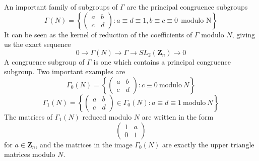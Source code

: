 An important family of subgroups of $\Gamma$ are the principal congruence subgroups
%
\[ \Gamma(N) = \left\{ \begin{pmatrix} a & b \\ c & d \end{pmatrix} : a \equiv d \equiv 1, b \equiv c \equiv 0\ \ \text{modulo N} \right\} \]
%
It can be seen as the kernel of reduction of the coefficients of $\Gamma$ modulo $N$, giving us the exact sequence
%
\[ 0 \to \Gamma(N) \to \Gamma \to SL_2(\mathbf{Z}_n) \to 0 \]
%
A congruence subgroup of $\Gamma$ is one which contains a principal congruence subgroup. Two important examples are
%
\[ \Gamma_0(N) = \left\{ \begin{pmatrix} a & b \\ c & d \end{pmatrix} : c \equiv 0\ \text{modulo}\ N \right\} \]
\[ \Gamma_1(N) = \left\{ \begin{pmatrix} a & b \\ c & d \end{pmatrix} \in \Gamma_0(N) : a \equiv d \equiv 1\ \text{modulo}\ N \right\} \]
%
The matrices of $\Gamma_1(N)$ reduced modulo $N$ are written in the form
%
\[ \begin{pmatrix} 1 & a \\ 0 & 1 \end{pmatrix} \]
%
for $a \in \mathbf{Z}_n$, and the matrices in the image $\Gamma_0(N)$ are exactly the upper triangle matrices modulo $N$.

